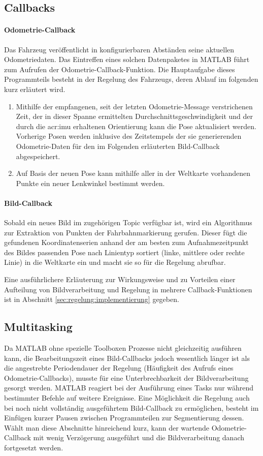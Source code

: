 \subsection{Callbacks}
\label{ssec:software_struktur:matlab:callbacks}
\paragraph{Odometrie-Callback}
Das Fahrzeug veröffentlicht in konfigurierbaren Abständen seine aktuellen Odometriedaten.
Das Eintreffen eines solchen Datenpaketes in MATLAB führt zum Aufrufen der Odometrie-Callback-Funktion. Die Hauptaufgabe dieses Programmteils besteht in der Regelung des Fahrzeugs, deren Ablauf im folgenden kurz erläutert wird.
\begin{enumerate}
\item Mithilfe der empfangenen, seit der letzten Odometrie-Message verstrichenen Zeit, der in dieser Spanne ermittelten Durchschnittsgeschwindigkeit und der durch die \gls{acr:imu} erhaltenen Orientierung kann die Pose aktualisiert werden. Vorherige Posen werden inklusive des Zeitstempels der sie generierenden Odometrie-Daten für den im Folgenden erläuterten Bild-Callback abgespeichert.
\item Auf Basis der neuen Pose kann mithilfe aller in der Weltkarte vorhandenen Punkte ein neuer Lenkwinkel bestimmt werden.
\end{enumerate}
\paragraph{Bild-Callback}
Sobald ein neues Bild im zugehörigen Topic verfügbar ist, wird ein Algorithmus zur Extraktion von Punkten der Fahrbahnmarkierung gerufen. Dieser fügt die gefundenen Koordinatenserien anhand der am besten zum Aufnahmezeitpunkt des Bildes passenden Pose nach Linientyp sortiert (\glqq linke\grqq , \glqq mittlere\grqq{} oder \glqq rechte\grqq{} Linie) in die Weltkarte ein und macht sie so für die Regelung abrufbar.

Eine ausführlichere Erläuterung zur Wirkungsweise und zu Vorteilen einer Aufteilung von Bildverarbeitung und Regelung in mehrere Callback-Funktionen ist in Abschnitt \ref{sec:regelung:implementierung} gegeben.
\subsection{Multitasking}
Da MATLAB ohne spezielle Toolboxen Prozesse nicht gleichzeitig ausführen kann, die Bearbeitungszeit eines Bild-Callbacks jedoch wesentlich länger ist als die angestrebte Periodendauer der Regelung (Häufigkeit des Aufrufs eines Odometrie-Callbacks), musste für eine Unterbrechbarkeit der Bildverarbeitung gesorgt werden. MATLAB reagiert bei der Ausführung eines Tasks nur während bestimmter Befehle auf weitere Ereignisse. Eine Möglichkeit die Regelung auch bei noch nicht vollständig ausgeführtem Bild-Callback zu ermöglichen, besteht im Einfügen kurzer Pausen zwischen Programmteilen zur Segmentierung dessen. Wählt man diese Abschnitte hinreichend kurz, kann der wartende Odometrie-Callback mit wenig Verzögerung ausgeführt und die Bildverarbeitung danach fortgesetzt werden.



